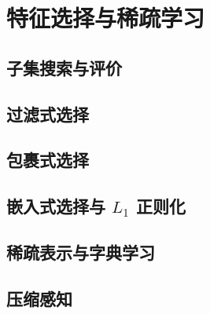 \newpage
\section{特征选择与稀疏学习}
\subsection{子集搜索与评价}
\subsection{过滤式选择}
\subsection{包裹式选择}
\subsection{嵌入式选择与 \texorpdfstring{$L_1$}.  正则化}
\subsection{稀疏表示与字典学习}
\subsection{压缩感知}